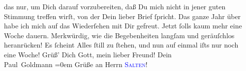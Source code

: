                das nur, um Dich darauf vorzubereiten, daß Du mich nicht in jener guten Stimmung
               treffen wirſt, von der Dein lieber Brief ſpricht.\pend
           \pstart
           {\pb}Das ganze Jahr über habe  ich mich auf das Wiederſehen mit Dir gefreut. Jetzt ſolls kaum mehr eine Woche
               dauern. Merkwürdig, wie die Begebenheiten langſam und geräuſchlos heranrücken! Es
               ſcheint Alles ſtill zu ſtehen, und nun auf einmal iſts nur noch eine Woche!{\dotsfive}\pend
           \pstart
           Grüß’ Dich Gott, mein lieber Freund!\pend
           \pstart
           Dein {\\[\baselineskip]}\spacefill\mbox{Paul Goldmann}\pend
           \leftskip=0em{}\pstart
           \noindent{}Grüße an Herrn \textsc{\textcolor{blue}{Salten}{}\ledrightnote{\textcolor{blue}{Felix Salten}}}!\pend
           \endnumbering{}  
      